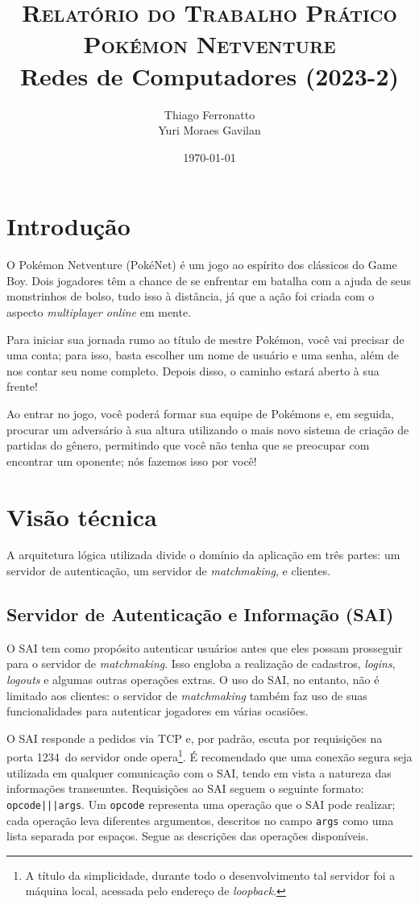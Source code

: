 \documentclass{article}
\title{\textsc{Relatório do Trabalho Prático}\\\textsc{\Huge Pokémon Netventure}\\{Redes de Computadores (2023-2)}}
\author{Thiago Ferronatto\\Yuri Moraes Gavilan}
\date{\today}
\newcommand{\iasPort}{1234}
\begin{document}
  \maketitle
  \begin{multicols}{2}
    \section{Introdução}
    
    O Pokémon Netventure (PokéNet) é um jogo ao espírito dos clássicos do Game Boy. Dois jogadores têm a chance de se enfrentar em batalha com a ajuda de seus monstrinhos de bolso, tudo isso à distância, já que a ação foi criada com o aspecto \textit{multiplayer online} em mente.
    
    Para iniciar sua jornada rumo ao título de mestre Pokémon, você vai precisar de uma conta; para isso, basta escolher um nome de usuário e uma senha, além de nos contar seu nome completo. Depois disso, o caminho estará aberto à sua frente!
    
    Ao entrar no jogo, você poderá formar sua equipe de Pokémons e, em seguida, procurar um adversário à sua altura utilizando o mais novo sistema de criação de partidas do gênero, permitindo que você não tenha que se preocupar com encontrar um oponente; nós fazemos isso por você!
    
    \section{Visão técnica}
    
    A arquitetura lógica utilizada divide o domínio da aplicação em três partes: um servidor de autenticação, um servidor de \textit{matchmaking}, e clientes.
    
    \subsection{Servidor de Autenticação e Informação (SAI)}
    
    O SAI tem como propósito autenticar usuários antes que eles possam prosseguir para o servidor de \textit{matchmaking}. Isso engloba a realização de cadastros, \textit{logins}, \textit{logouts} e algumas outras operações extras. O uso do SAI, no entanto, não é limitado aos clientes: o servidor de \textit{matchmaking} também faz uso de suas funcionalidades para autenticar jogadores em várias ocasiões.
    
    O SAI responde a pedidos via TCP e, por padrão, escuta por requisições na porta \iasPort\ do servidor onde opera\footnote{A título da simplicidade, durante todo o desenvolvimento tal servidor foi a máquina local, acessada pelo endereço de \textit{loopback}.}. É recomendado que uma conexão segura seja utilizada em qualquer comunicação com o SAI, tendo em vista a natureza das informações transeuntes. Requisições ao SAI seguem o seguinte formato: \texttt{opcode|||args}. Um \texttt{opcode} representa uma operação que o SAI pode realizar; cada operação leva diferentes argumentos, descritos no campo \texttt{args} como uma lista separada por espaços. Segue as descrições das operações disponíveis.
    

\end{multicols}
\end{document}
